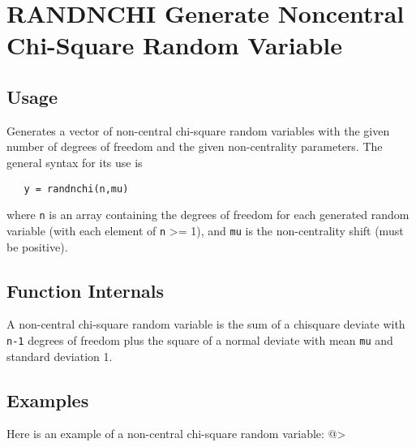 \section{RANDNCHI Generate Noncentral Chi-Square Random Variable}

\subsection{Usage}

Generates a vector of non-central chi-square random variables
with the given number of degrees of freedom and the given
non-centrality parameters.  The general syntax for its use is
\begin{verbatim}
   y = randnchi(n,mu)
\end{verbatim}
where \verb|n| is an array containing the degrees of freedom for
each generated random variable (with each element of \verb|n| >= 1),
and \verb|mu| is the non-centrality shift (must be positive).
\subsection{Function Internals}

A non-central chi-square random variable is the sum of a chisquare
deviate with \verb|n-1| degrees of freedom plus the square of a normal
deviate with mean \verb|mu| and standard deviation 1.
\subsection{Examples}

Here is an example of a non-central chi-square random variable:
@>
